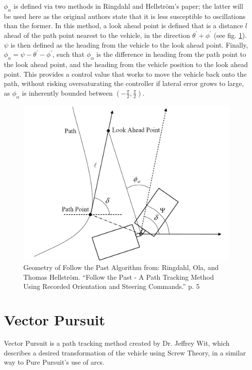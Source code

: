 \documentclass[mla7]{mla}
\begin{document}
\begin{paper}
$\phi_\alpha$ is defined via two methods in Ringdahl and Hellström's paper; the latter will be used here as the original authors state that it is less susceptible to oscillations than the former. In this method, a look ahead point is defined that is a distance $l$ ahead of the path point nearest to the vehicle, in the direction $\theta^\prime+\phi^\prime$ (see fig. \ref{img:ftp1}). $\psi$ is then defined as the heading from the vehicle to the look ahead point. Finally, $\phi_\alpha=\psi-\theta^\prime-\phi^\prime$, such that $\phi_\alpha$ is the difference in heading from the path point to the look ahead point, and the heading from the vehicle position to the look ahead point. This provides a control value that works to move the vehicle back onto the path, without risking oversaturating the controller if lateral error grows to large, as $\phi_\alpha$ is inherently bounded between $(-\frac{\pi}{2},\frac{\pi}{2})$.

\begin{figure}[H]
\includegraphics[width=0.5\linewidth]{RingdahlFtPDiagram}
\captionsetup{justification=centering,margin=2cm}
\caption{Geometry of Follow the Past Algorithm from: Ringdahl, Ola, and Thomas Hellström. “Follow the Past - A Path Tracking Method Using Recorded Orientation and Steering Commands.” p. 5}
\label{img:ftp1}
\end{figure}

\section{Vector Pursuit}

Vector Pursuit is a path tracking method created by Dr. Jeffrey Wit, which describes a desired transformation of the vehicle using Screw Theory, in a similar way to Pure Pursuit's use of arcs.


\end{paper}
\end{document}
